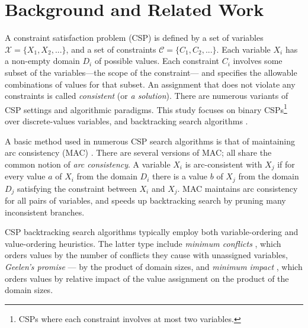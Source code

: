 \section{Background and Related Work}
\label{sec:csp-background}

A constraint satisfaction problem (CSP) is defined by a set
of variables $\mathcal{X}=\{X_1, X_2, ...\}$, and a set of
constraints $\mathcal{C}=\{C_1, C_2, ...\}$. Each variable $X_i$ has a non-empty domain
$D_i$ of possible values. Each constraint $C_i$ involves some subset
of the variables---the scope of the constraint--- and specifies the
allowable combinations of values for that subset. An assignment that
does not violate any constraints is called {\em consistent} (or {\em a solution}).
There are numerous variants of CSP settings and algorithmic paradigms. This
study focuses on binary CSPs\footnote{CSPs where each constraint
involves at most two variables.} over discrete-values variables,
and backtracking search algorithms \cite{Tsang.csp}.

A basic method used in numerous CSP search algorithms is
that of maintaining arc consistency (MAC)
\cite{Sabin.mac}. There are several versions of MAC; all
share the common notion of {\em
arc consistency}.
A variable $X_i$ is arc-consistent with $X_j$ if for every value $a$ of
$X_i$ from the domain $D_i$ there is a value $b$ of $X_j$ from the
domain $D_j$ satisfying the constraint between $X_i$ and $X_j$. MAC
maintains arc consistency for all pairs of variables, and
speeds up backtracking search by pruning many inconsistent
branches.

CSP backtracking search algorithms typically employ both
variable-ordering \cite{Tsang.csp} and value-ordering heuristics.  The
latter type include \emph{minimum conflicts} \cite{Tsang.csp}, which
orders values by the number of conflicts they cause with unassigned
variables, \emph{Geelen's promise} \cite{Geelen.promise} --- by the
product of domain sizes, and \emph{minimum impact}
\cite{Refalo.impact}, which orders values by relative impact of the
value assignment on the product of the domain sizes.

